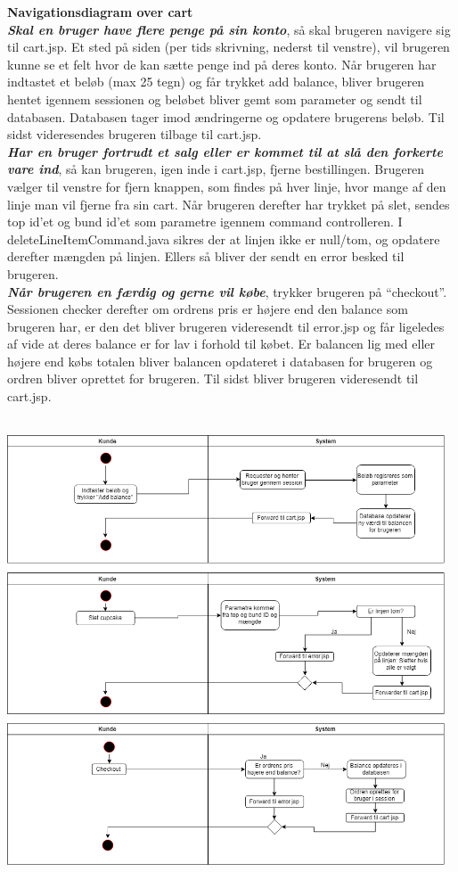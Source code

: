 \documentclass[11pt]{report}
\begin{document}
\noindent
\textbf{Navigationsdiagram over cart}\\
\textbf{\textit{Skal en bruger have flere penge på sin konto}}, så skal
brugeren navigere sig til cart.jsp. Et sted på siden (per tids
skrivning, nederst til venstre), vil brugeren kunne se et felt hvor de
kan sætte penge ind på deres konto. Når brugeren har indtastet et
beløb (max 25 tegn) og får trykket add balance, bliver brugeren hentet
igennem sessionen og beløbet bliver gemt som parameter og sendt til
databasen. Databasen tager imod ændringerne og opdatere brugerens
beløb. Til sidst videresendes brugeren tilbage til cart.jsp.\\
\textbf{\textit{Har en bruger fortrudt et salg eller er kommet til at slå den
  forkerte vare ind}}, så kan brugeren, igen inde i cart.jsp, fjerne
bestillingen. Brugeren vælger til venstre for fjern knappen, som
findes på hver linje, hvor mange af den linje man vil fjerne fra sin
cart. Når brugeren derefter har trykket på slet, sendes top id'et og
bund id'et som parametre igennem command controlleren. I
deleteLineItemCommand.java sikres der at linjen ikke er null/tom, og
opdatere derefter mængden på linjen. Ellers så bliver der sendt en
error besked til brugeren.\\
\textbf{\textit{Når brugeren en færdig og gerne vil købe}}, trykker brugeren på
“checkout”. Sessionen checker derefter om ordrens pris er højere end
den balance som brugeren har, er den det bliver brugeren videresendt
til error.jsp og får ligeledes af vide at deres balance er for lav i
forhold til købet. Er balancen lig med eller højere end købs totalen
bliver balancen opdateret i databasen for brugeren og ordren bliver
oprettet for brugeren. Til sidst bliver brugeren videresendt til
cart.jsp.\\\\
\begin{center}
\includegraphics[width=13cm]{CartCupcake.png}
\end{center}
\newpage
\end{document}
